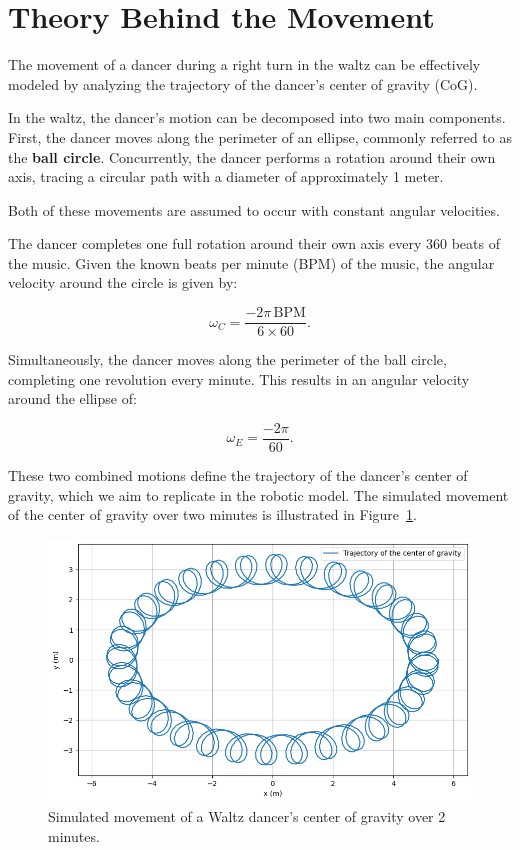 \documentclass{amsart}
\theoremstyle{definition}
\theoremstyle{plain}
\begin{document}
\section{Theory Behind the Movement}

The movement of a dancer during a right turn in the waltz can be effectively modeled by analyzing the trajectory of the dancer’s center of gravity (CoG). 

In the waltz, the dancer’s motion can be decomposed into two main components. First, the dancer moves along the perimeter of an ellipse, commonly referred to as the \textbf{ball circle}. Concurrently, the dancer performs a rotation around their own axis, tracing a circular path with a diameter of approximately 1 meter. 

Both of these movements are assumed to occur with constant angular velocities.

The dancer completes one full rotation around their own axis every 360 beats of the music. Given the known beats per minute (BPM) of the music, the angular velocity around the circle is given by:

$$\omega_C = \frac{-2\pi \, \text{BPM}}{6 \times 60}.$$

Simultaneously, the dancer moves along the perimeter of the ball circle, completing one revolution every minute. This results in an angular velocity around the ellipse of:

$$\omega_E = \frac{-2\pi}{60}.$$

These two combined motions define the trajectory of the dancer's center of gravity, which we aim to replicate in the robotic model. The simulated movement of the center of gravity over two minutes is illustrated in Figure~\ref{fig:cog_movement}.

\begin{figure}
  \centering
  \includegraphics[width = 0.5 \columnwidth]{img/waltz_cog_movement.png} 
  \caption{Simulated movement of a Waltz dancer's center of gravity over 2 minutes.}\label{fig:cog_movement}
\end{figure}
\end{document}
